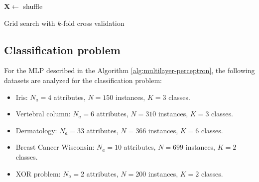 \documentclass[12pt,a4paper]{article}
\begin{document}
\begin{algorithm}[H]
    \DontPrintSemicolon
      
      
    \(\mathbf{X} \leftarrow\) shuffle
    

    \caption{Grid search with \(k\)-fold cross validation}
    \label{alg:grid-search-k-fold-cross-validation}
\end{algorithm}

\subsection{Classification problem}

For the MLP described in the Algorithm \ref{alg:multilayer-perceptron}, the following datasets are analyzed for the classification problem:
\begin{itemize}
    \item Iris: \(N_a = 4\) attributes, \(N = 150\) instances, \(K =3\) classes.
    \item Vertebral column: \(N_a = 6\) attributes, \(N = 310\) instances, \(K =3\) classes.
    \item Dermatology: \(N_a = 33\) attributes, \(N = 366\) instances, \(K = 6\) classes.
    \item Breast Cancer Wisconsin: \(N_a = 10\) attributes, \(N = 699\) instances, \(K = 2\) classes.
    \item XOR problem: \(N_a = 2\) attributes, \(N = 200\) instances, \(K = 2\) classes.
\end{itemize}
\end{document}
